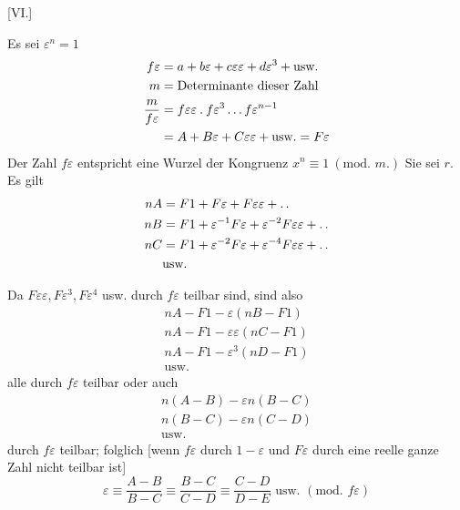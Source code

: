 %
\begin{center}[VI.]\end{center}
Es sei $\varepsilon^n=1$
\[
\begin{aligned}
f\varepsilon&=a+b\varepsilon+c\varepsilon\varepsilon+d\varepsilon^3+\text{usw.}\\
m&=\text{Determinante dieser Zahl}\\
\frac{m}{f\varepsilon}&=f\varepsilon\varepsilon\mathbin{.} f\varepsilon^3\ldots f\varepsilon^{n-1}\\
&=A+B\varepsilon+C\varepsilon\varepsilon+\text{usw.}=F\varepsilon
\end{aligned}
\]
Der Zahl $f\varepsilon$ entspricht eine Wurzel der Kongruenz $x^n\equiv1\ (\text{mod. }m.)$ Sie sei $r$. Es gilt
\[
\begin{aligned}
nA&=F1+F\varepsilon+F\varepsilon\varepsilon+\mathinner{.\,.}\\
nB&=F1+\varepsilon^{-1}F\varepsilon+\varepsilon^{-2}F\varepsilon\varepsilon+\mathinner{.\,.}\\
nC&=F1+\varepsilon^{-2}F\varepsilon+\varepsilon^{-4}F\varepsilon\varepsilon+\mathinner{.\,.}\\
&\text{usw.}
\end{aligned}
\]

Da $F\varepsilon\varepsilon,F\varepsilon^3,F\varepsilon^4$ usw. durch $f\varepsilon$ teilbar sind, sind also
\[
\begin{gathered}
nA-F1-\varepsilon(nB-F1)\\
nA-F1-\varepsilon\varepsilon(nC-F1)\\
nA-F1-\varepsilon^3(nD-F1)\\
\text{usw.}
\end{gathered}
\]
alle durch $f\varepsilon$ teilbar oder auch
\[
\begin{gathered}
n(A-B)-\varepsilon n(B-C)\\
n(B-C)-\varepsilon n(C-D)\\
\text{usw.}
\end{gathered}
\]
durch $f\varepsilon$ teilbar; folglich [wenn $f\varepsilon$ durch $1-\varepsilon$ und $F\varepsilon$ durch eine reelle ganze Zahl nicht teilbar ist]
\[
\varepsilon\equiv\frac{A-B}{B-C}\equiv\frac{B-C}{C-D}\equiv\frac{C-D}{D-E}\text{ usw. }(\text{mod. }f\varepsilon)
\]

